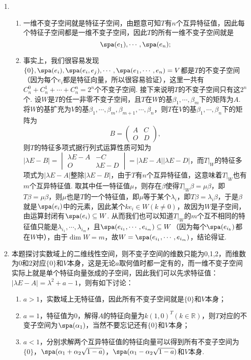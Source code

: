 \begin{enumerate}
    \item \begin{enumerate}
        \item 一维不变子空间就是特征子空间，由题意可知$T$有$n$个互异特征值，因此每个特征子空间都是一维不变子空间，因此$T$的所有一维不变子空间就是
        \[\spa(e_1),\cdots,\spa(e_n);\]
        \item 事实上，我们很容易发现$\{0\},\spa(e_i),\spa(e_i,e_j),\cdots,\spa(e_1,\cdots,e_n)=V$都是$T$的不变子空间（因为每个$e_i$都是特征向量，所以很容易验证），这里一共有$C_n^0+C_n^1+\cdots+C_n^n=2^n$个不变子空间. 接下来说明$T$的不变子空间只有这$2^n$个. 设$W$是$T$的任一非零不变子空间，且$T$在$W$的基$\beta_1,\cdots,\beta_m$下的矩阵为$A$. 将$W$的基扩充为$V$的基$\beta_1,\cdots,\beta_m,\beta_{m+1},\cdots,\beta_n$，则$T$在$V$的基$\beta_1,\cdots,\beta_n$下的矩阵为
        \[B=\begin{pmatrix}
            A & C \\ O & D
        \end{pmatrix},\]
        则$T$的特征多项式据行列式运算性质可知为$|\lambda E-B|=\begin{vmatrix}
            \lambda E-A & -C \\ O & \lambda E-D
        \end{vmatrix}=|\lambda E-A||\lambda E-D|$，而$T\vert_W$的特征多项式为$|\lambda E-A|$整除$|\lambda E-B|$，由于$T$有$n$个互异特征值，这意味着$T\vert_W$也有$m$个互异特征值. 取其中任一特征值$\mu$，则存在$\beta$使得$T\vert_W\beta=\mu\beta$，即$T\beta=\mu\beta$，则$\mu$也是$T$的一个特征值，即$\mu$等于某个$\lambda_i$，即$T\beta=\lambda_i\beta$，于是$\beta$就是$\spa(e_i)$中的元素，因此某个$ke_i\in W(k\neq 0)$，故因为$W$是子空间，由运算封闭有$\spa(e_i)\subseteq W$. 从而我们也可以知道$T\vert_W$的$m$个互不相同的特征值只能是$\lambda_{i_1},\cdots,\lambda_{i_m}$，且$\spa(e_{i_1},\cdots,e_{i_m})\subseteq W$（因为每个$\spa(e_{i_k})$都在$W$中），由于$\dim W=m$，故$W=\spa(e_{i_1},\cdots,e_{i_m})$，结论得证.
    \end{enumerate}

    \item 本题探讨实数域上的二维线性空间，则不变子空间的维数只能为0,1,2，而维数为0和2对应$\{0\}$和$V$本身，这是无论$a$取何值时都一定有的，而一维不变子空间实际上就是单个特征向量张成的子空间，因此我们可以先求特征值：$|\lambda E-A|=\lambda^2+a-1$，则有如下讨论：
    \begin{enumerate}
        \item $a>1$，实数域上无特征值，因此所有不变子空间就是$\{0\}$和$V$本身；
        \item $a=1$，特征值为0，解得$A$的特征向量为$k(1,0)^T(k\in\mathbb{R})$，则$T$对应的不变子空间为$\spa(\alpha_1)$，当然不要忘记还有$\{0\}$和$V$本身；
        \item $a<1$，分别求解两个互异特征值的特征向量可以得到所有不变子空间为$\{0\}$，$\spa(\alpha_1+\alpha_2\sqrt{1-a})$，$\spa(\alpha_1-\alpha_2\sqrt{1-a})$和$V$本身.
    \end{enumerate}


\end{enumerate}
